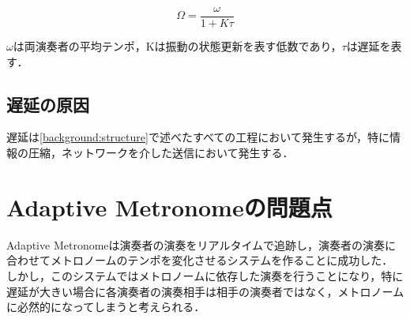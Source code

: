 \begin{displaymath}
  \Omega = \frac{\omega }{1 + K\tau}
\end{displaymath}

\begin{math}\omega \end{math}は両演奏者の平均テンポ，Kは振動の状態更新を表す低数であり，\begin{math}\tau \end{math}は遅延を表す．

\subsection{遅延の原因}
遅延は\ref{background:structure}で述べたすべての工程において発生するが，特に情報の圧縮，ネットワークを介した送信において発生する．

\section{Adaptive Metronomeの問題点}
\label{related:admet}
Adaptive Metronomeは演奏者の演奏をリアルタイムで追跡し，演奏者の演奏に合わせてメトロノームのテンポを変化させるシステムを作ることに成功した．
しかし，このシステムではメトロノームに依存した演奏を行うことになり，特に遅延が大きい場合に各演奏者の演奏相手は相手の演奏者ではなく，メトロノームに必然的になってしまうと考えられる．



